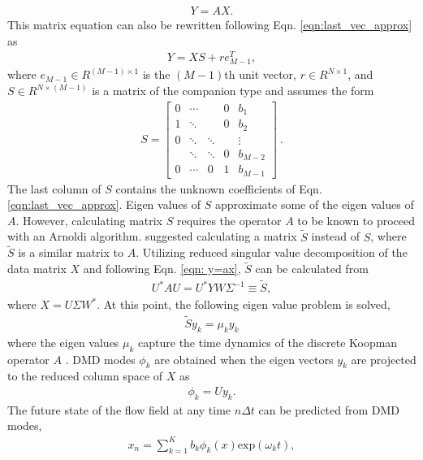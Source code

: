 \begin{align}
 Y = A X.
\label{eqn: y=ax}
\end{align}
This matrix equation can also be rewritten following Eqn. \ref{eqn:last_vec_approx} as
\begin{align}
  Y =X S + r e^{T}_{M-1},
\end{align}
where $e_{M-1} \in R^{(M-1) \times 1}$ is the $(M-1)$th unit vector, $r \in R^{N \times 1}$, and $S \in R^{N \times (M-1)}$ is a matrix of the companion type and assumes the form
\begin{align}
S =
    \begin{bmatrix}
        0 & \cdots &        & 0  & b_1\\
        1 & \ddots &        & 0  & b_2 \\
        0 & \ddots & \ddots &    & \vdots \\
          & \ddots & \ddots & 0  & b_{M-2} \\
        0 & \cdots & 0      & 1  & b_{M-1}
    \end{bmatrix}\ .
\end{align}
The last column of $S$ contains the unknown coefficients of Eqn. \ref{eqn:last_vec_approx}. Eigen values of $S$ approximate some of the eigen values of $A$. However, calculating matrix $S$ requires the operator $A$ to be known to proceed with an Arnoldi algorithm. \citet{schmid_jfm2010} suggested calculating a matrix $\tilde{S}$ instead of $S$, where $\tilde{S}$ is a similar matrix to $A$. Utilizing reduced singular value decomposition of the data matrix $X$ and following Eqn. \ref{eqn: y=ax}, $\tilde{S}$ can be calculated from
\begin{align}
U^{*} A U  = U^{*} YW  \Sigma^{-1} \equiv \tilde{S},
\end{align}
where $X=U\Sigma W^{*}$. At this point, the following eigen value problem is solved,
\begin{align}
\tilde{S}y_{k}  =  \mu_{k} y_{k} 
\end{align}
where the eigen values $\mu_{k}$ capture the time dynamics of the discrete Koopman operator $A$ \citep{kutz_book2013}. DMD modes $\phi_{k}$ are obtained when the eigen vectors $y_{k}$ are projected to the reduced column space of $X$ as
\begin{align}
\phi_{k} = Uy_{k}.
\end{align}
The future state of the flow field at any time $n \Delta t$ can be predicted from DMD modes, 
\begin{align}
x_{n} = \sum_{k=1}^{K} b_{k} \phi_{k}(x) \text{exp}(\omega_{k} t),
\end{align}
